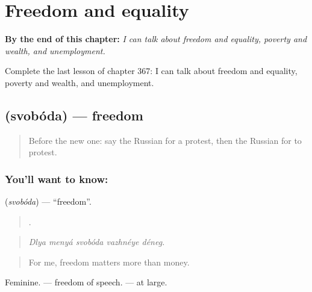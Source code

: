 
\chapter{Freedom and equality}
\label{ch:ru-freedom-and-equality}

\begin{chapteropening}
\textbf{By the end of this chapter:} \emph{I can talk about freedom and equality, poverty and wealth, and unemployment.}

Complete the last lesson of chapter 367: I can talk about freedom and equality, poverty and wealth, and unemployment.
\end{chapteropening}

\section[\texorpdfstring{\ru{свобода} (svobóda)}{свобода (svobóda)}]{ (svobóda) — freedom}

\label{lesson:RU-C367-svoboda}



\begin{quote}
Before the new one: say the Russian for a protest, then the Russian for to protest.
\end{quote}

\subsection*{You'll want to know: }
\textbf{} (\emph{svobóda}) — \textquotedblleft{}freedom\textquotedblright{}.

\begin{quote}
    .
\end{quote}

\begin{quote}
\emph{Dlya menyá svobóda vazhnéye déneg.}
\end{quote}

\begin{quote}
For me, freedom matters more than money.
\end{quote}

Feminine. \emph{ } — freedom of speech. \emph{ } — at large.


